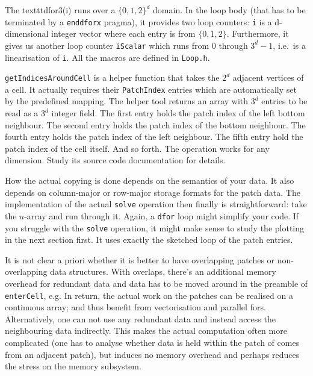 \noindent
The texttt{dfor3(i)} runs over a $\{0,1,2\}^d$ domain.
In the loop body (that has to be terminated by a \texttt{enddforx} pragma), it
provides two loop counters: \texttt{i} is a d-dimensional integer vector where
each entry is from $\{0,1,2\}$.
Furthermore, it gives us another loop counter \texttt{iScalar} which runs from 0
through $3^d-1$, i.e.~is a linearisation of \texttt{i}.
All the macros are defined in \texttt{Loop.h}.


\texttt{getIndicesAroundCell} is a helper function that takes the $2^d$ adjacent
vertices of a cell.
It actually requires their \texttt{PatchIndex} entries which are automatically
set by the predefined mapping.
The helper tool returns an array with $3^d$ entries to be read as a $3^d$
integer field.
The first entry holds the patch index of the left bottom neighbour.
The second entry holds the patch index of the bottom neighbour.
The fourth entry holds the patch index of the left neighbour.
The fifth entry hold the patch index of the cell itself.
And so forth.
The operation works for any dimension.
Study its source code documentation for details.


How the actual copying is done depends on the semantics of your data. 
It also depends on column-major or row-major storage formats for the patch data.
The implementation of the actual \texttt{solve} operation then finally is
straightforward: take the $u$-array and run through it. Again, a \texttt{dfor}
loop might simplify your code.
If you struggle with the \texttt{solve} operation, it might make sense to study
the plotting in the next section first. 
It uses exactly the sketched loop of the patch entries.


\begin{remark}
  It is not clear a priori whether it is better to have overlapping patches or
  non-overlapping data structures. With overlaps, there's an additional memory
  overhead for redundant data and data has to be moved around in the preamble of
  \texttt{enterCell}, e.g. In return, the actual work on the patches can be
  realised on a continuous array; and thus benefit from vectorisation and
  parallel fors. Alternatively, one can not use any redundant data and instead
  access the neighbouring data indirectly. This makes the actual computation
  often more complicated (one has to analyse whether data is held within the
  patch of comes from an adjacent patch), but induces no memory overhead and
  perhaps reduces the stress on the memory subsystem.
\end{remark}



